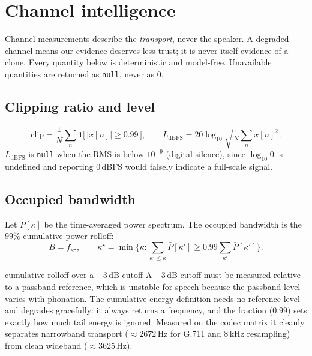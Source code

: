 \documentclass[11pt,a4paper]{article}
\newcommand{\code}[1]{\texttt{\small #1}}
\begin{document}
\section{Channel intelligence}
\label{sec:channel}

Channel measurements describe the \emph{transport}, never the speaker. A degraded
channel means our evidence deserves less trust; it is never itself evidence of a clone.
Every quantity below is deterministic and model-free. Unavailable quantities are
returned as \code{null}, never as $0$.

\subsection{Clipping ratio and level}
\begin{equation}
\mathrm{clip} = \frac{1}{N}\sum_{n} \mathbf{1}\big[\,|x[n]| \ge 0.99\,\big],
\qquad
L_{\mathrm{dBFS}} = 20\log_{10}\!\sqrt{\tfrac{1}{N}\textstyle\sum_n x[n]^2}.
\end{equation}
$L_{\mathrm{dBFS}}$ is \code{null} when the RMS is below $10^{-9}$ (digital silence),
since $\log_{10} 0$ is undefined and reporting $0$\,dBFS would falsely indicate a
full-scale signal.

\subsection{Occupied bandwidth}

Let $\bar P[\kappa]$ be the time-averaged power spectrum. The occupied bandwidth is the
$99\%$ cumulative-power rolloff:
\begin{equation}
B = f_{\kappa^\star}, \qquad
\kappa^\star = \min\Big\{\kappa : \textstyle\sum_{\kappa' \le \kappa}\bar P[\kappa'] \ge 0.99 \sum_{\kappa'}\bar P[\kappa'] \Big\}.
\end{equation}

\begin{whybox}{cumulative rolloff over a $-3$\,dB cutoff}
A $-3$\,dB cutoff must be measured relative to a passband reference, which is unstable
for speech because the passband level varies with phonation. The cumulative-energy
definition needs no reference level and degrades gracefully: it always returns a
frequency, and the fraction ($0.99$) sets exactly how much tail energy is ignored.
Measured on the codec matrix it cleanly separates narrowband transport
($\approx 2672$\,Hz for G.711 and $8$\,kHz resampling) from clean wideband
($\approx 3625$\,Hz).
\end{whybox}
\end{document}
